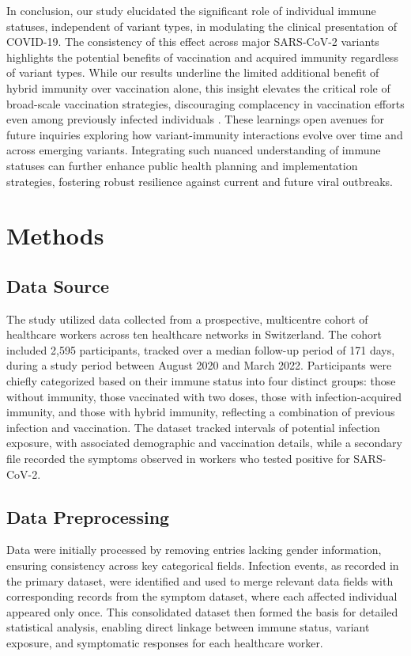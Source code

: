 \documentclass[11pt]{article}
\begin{document}
In conclusion, our study elucidated the significant role of individual immune statuses, independent of variant types, in modulating the clinical presentation of COVID-19. The consistency of this effect across major SARS-CoV-2 variants highlights the potential benefits of vaccination and acquired immunity regardless of variant types. While our results underline the limited additional benefit of hybrid immunity over vaccination alone, this insight elevates the critical role of broad-scale vaccination strategies, discouraging complacency in vaccination efforts even among previously infected individuals \cite{Goldberg2022ProtectionAW}. These learnings open avenues for future inquiries exploring how variant-immunity interactions evolve over time and across emerging variants. Integrating such nuanced understanding of immune statuses can further enhance public health planning and implementation strategies, fostering robust resilience against current and future viral outbreaks.

\section*{Methods}

\subsection*{Data Source}
The study utilized data collected from a prospective, multicentre cohort of healthcare workers across ten healthcare networks in Switzerland. The cohort included 2,595 participants, tracked over a median follow-up period of 171 days, during a study period between August 2020 and March 2022. Participants were chiefly categorized based on their immune status into four distinct groups: those without immunity, those vaccinated with two doses, those with infection-acquired immunity, and those with hybrid immunity, reflecting a combination of previous infection and vaccination. The dataset tracked intervals of potential infection exposure, with associated demographic and vaccination details, while a secondary file recorded the symptoms observed in workers who tested positive for SARS-CoV-2.

\subsection*{Data Preprocessing}
Data were initially processed by removing entries lacking gender information, ensuring consistency across key categorical fields. Infection events, as recorded in the primary dataset, were identified and used to merge relevant data fields with corresponding records from the symptom dataset, where each affected individual appeared only once. This consolidated dataset then formed the basis for detailed statistical analysis, enabling direct linkage between immune status, variant exposure, and symptomatic responses for each healthcare worker.
\end{document}
